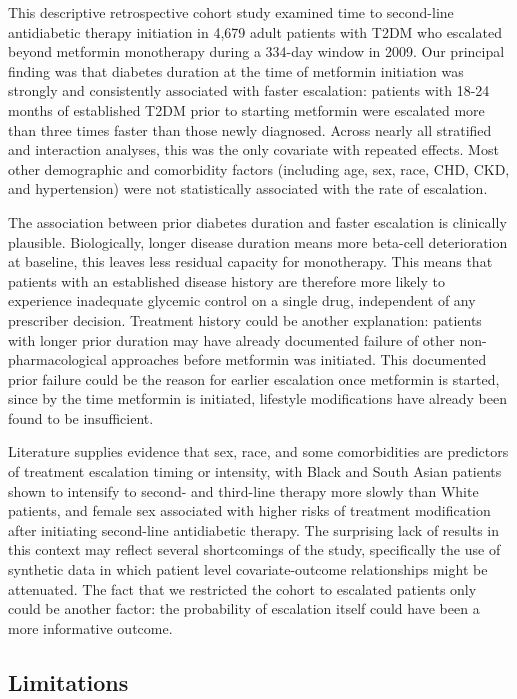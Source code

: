 \documentclass[twoside,11pt]{article}
\begin{document}
This descriptive retrospective cohort study examined time to second-line antidiabetic therapy initiation in 4,679 adult patients with T2DM who escalated beyond metformin monotherapy during a 334-day window in 2009. Our principal finding was that diabetes duration at the time of metformin initiation was strongly and consistently associated with faster escalation: patients with 18-24 months of established T2DM prior to starting metformin were escalated more than three times faster than those newly diagnosed. Across nearly all stratified and interaction analyses, this was the only covariate with repeated effects. Most other demographic and comorbidity factors (including age, sex, race, CHD, CKD, and hypertension) were not statistically associated with the rate of escalation.

The association between prior diabetes duration and faster escalation is clinically plausible. Biologically, longer disease duration means more beta-cell deterioration at baseline, this leaves less residual capacity for monotherapy\cite{sims2020beta_cell}. This means that patients with an established disease history are therefore more likely to experience inadequate glycemic control on a single drug, independent of any prescriber decision. Treatment history could be another explanation: patients with longer prior duration may have already documented failure of other non-pharmacological approaches before metformin was initiated. This documented prior failure could be the reason for earlier escalation once metformin is started, since by the time metformin is initiated, lifestyle modifications have already been found to be insufficient.

Literature supplies evidence that sex, race, and some comorbidities are predictors of treatment escalation timing or intensity, with Black and South Asian patients shown to intensify to second- and third-line therapy more slowly than White patients\cite{mathur2020ethnic_disparities}, and female sex associated with higher risks of treatment modification after initiating second-line antidiabetic therapy\cite{liss2023treatment_modification}. The surprising lack of results in this context may reflect several shortcomings of the study, specifically the use of synthetic data in which patient level covariate-outcome relationships might be attenuated. The fact that we restricted the cohort to escalated patients only could be another factor: the probability of escalation itself could have been a more informative outcome.

\subsection*{Limitations}
\end{document}
